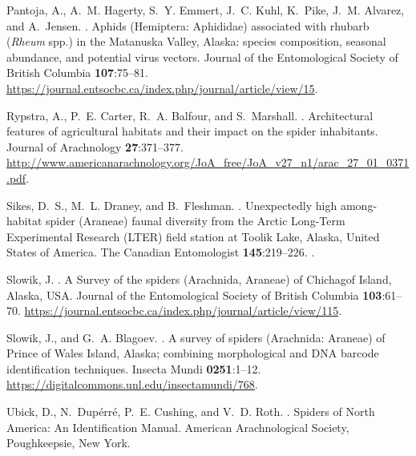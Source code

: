 \begin{thebibliography}{13}
Pantoja, A., A.~M. Hagerty, S.~Y. Emmert, J.~C. Kuhl, K.~Pike, J.~M. Alvarez,
  and A.~Jensen.
.
\newblock Aphids ({Hemiptera}: {Aphididae}) associated with rhubarb
  ({\textit{Rheum}} spp.) in the {Matanuska} {Valley}, {Alaska}: species
  composition, seasonal abundance, and potential virus vectors.
\newblock Journal of the Entomological Society of British Columbia {\bfseries
  107}:75--81.
\newblock
  \urlprefix\url{https://journal.entsocbc.ca/index.php/journal/article/view/15}.

Rypstra, A., P.~E. Carter, R.~A. Balfour, and S.~Marshall.
.
\newblock Architectural features of agricultural habitats and their impact on
  the spider inhabitants.
\newblock Journal of Arachnology {\bfseries 27}:371--377.
\newblock
  \urlprefix\url{http://www.americanarachnology.org/JoA_free/JoA_v27_n1/arac_27_01_0371.pdf}.

Sikes, D.~S., M.~L. Draney, and B.~Fleshman.
.
\newblock Unexpectedly high among-habitat spider ({Aranea}e) faunal diversity
  from the {Arctic} {Long}-{Term} {Experimental} {Research} ({LTER}) field
  station at {Toolik} {Lake}, {Alaska}, {United} {States} of {America}.
\newblock The Canadian Entomologist {\bfseries 145}:219–226.
\newblock {}.

Slowik, J.
.
\newblock A Survey of the spiders ({Arachnida}, {Araneae}) of {Chichagof}
  {Island}, {Alaska}, {USA}.
\newblock Journal of the Entomological Society of British Columbia {\bfseries
  103}:61--70.
\newblock
  \urlprefix\url{https://journal.entsocbc.ca/index.php/journal/article/view/115}.

Slowik, J., and G.~A. Blagoev.
.
\newblock A survey of spiders ({Arachnida}: {Araneae}) of {Prince} of {Wales}
  {Island}, {Alaska}; combining morphological and {DNA} barcode identification
  techniques.
\newblock Insecta Mundi {\bfseries 0251}:1--12.
\newblock \urlprefix\url{https://digitalcommons.unl.edu/insectamundi/768}.

Ubick, D., N.~Dup\'{e}rr\'{e}, P.~E. Cushing, and V.~D. Roth.
.
\newblock Spiders of North America: An Identification Manual.
\newblock American Arachnological Society, Poughkeepsie, New York.


\end{thebibliography}
